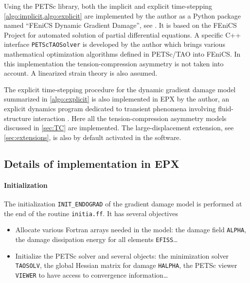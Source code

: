 Using the PETSc library, both the implicit and explicit time-stepping \cref{algo:implicit,algo:explicit} are implemented by the author as a Python package named ``FEniCS Dynamic Gradient Damage'', see \cite{LiMaurini:2015}. It is based on the FEniCS Project \cite{LoggMardalWells:2012} for automated solution of partial differential equations. A specific C++ interface \texttt{PETScTAOSolver} is developed by the author which brings various mathematical optimization algorithms defined in PETSc/TAO into FEniCS. In this implementation the tension-compression asymmetry is not taken into account. A linearized strain theory is also assumed.

The explicit time-stepping procedure for the dynamic gradient damage model summarized in \cref{algo:explicit} is also implemented in EPX by the author, an explicit dynamics program dedicated to transient phenomena involving fluid-structure interaction \cite{EPX:2015}. Here all the tension-compression asymmetry models discussed in \cref{sec:TC} are implemented. The large-displacement extension, see \cref{sec:extensions}, is also by default activated in the software.

\subsection{Details of implementation in EPX} \label{sec:epx}
\paragraph{Initialization}
The initialization \texttt{INIT\_ENDOGRAD} of the gradient damage model is performed at the end of the routine \texttt{initia.ff}. It has several objectives
\begin{itemize}
\item Allocate various Fortran arrays needed in the model: the damage field \texttt{ALPHA}, the damage dissipation energy for all elements \texttt{EFISS}\ldots

\item Initialize the PETSc solver and several objects: the minimization solver \texttt{TAOSOLV}, the global Hessian matrix for damage \texttt{HALPHA}, the PETSc viewer \texttt{VIEWER} to have access to convergence information\ldots
\end{itemize}

